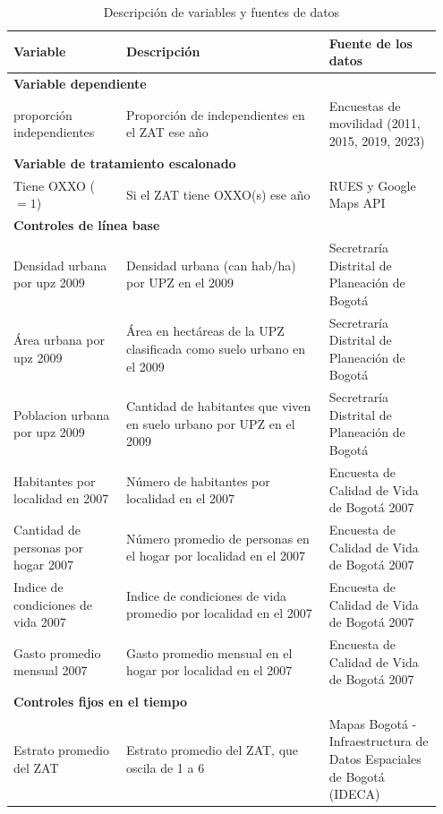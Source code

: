 \documentclass{article}
\begin{document}
\begin{longtable}{p{0.25\linewidth} p{0.45\linewidth} p{0.25\linewidth}}
\caption{Descripción de variables y fuentes de datos}
\label{tab:variables_descripcion}
\\
\toprule
\textbf{Variable} & \textbf{Descripción} & \textbf{Fuente de los datos} \\
\midrule
\endhead
\midrule
\multicolumn{3}{l}{\textbf{Variable dependiente}} \\
\midrule
proporción independientes & Proporción de independientes en el ZAT ese año & Encuestas de movilidad (2011, 2015, 2019, 2023) \\
\midrule
\multicolumn{3}{l}{\textbf{Variable de tratamiento escalonado}} \\
\midrule
Tiene OXXO ($=1$) & Si el ZAT tiene OXXO(s) ese año & RUES y Google Maps API \\
\midrule
\multicolumn{3}{l}{\textbf{Controles de línea base}} \\
\midrule
Densidad urbana por upz 2009 & Densidad urbana (can hab/ha) por UPZ en el 2009 & Secretraría Distrital de Planeación de Bogotá \\
\midrule
Área urbana por upz 2009 & Área en hectáreas de la UPZ clasificada como suelo urbano en el 2009 & Secretraría Distrital de Planeación de Bogotá \\
\midrule
Poblacion urbana por upz 2009 & Cantidad de habitantes que viven en suelo urbano por UPZ en el 2009 & Secretraría Distrital de Planeación de Bogotá \\
\midrule
Habitantes por localidad en 2007 & Número de habitantes por localidad en el 2007 & Encuesta de Calidad de Vida de Bogotá 2007 \\
\midrule
Cantidad de personas por hogar 2007 & Número promedio de personas en el hogar por localidad en el 2007 & Encuesta de Calidad de Vida de Bogotá 2007 \\
\midrule
Indice de condiciones de vida 2007 & Indice de condiciones de vida promedio por localidad en el 2007 & Encuesta de Calidad de Vida de Bogotá 2007 \\
\midrule
Gasto promedio mensual 2007 & Gasto promedio mensual en el hogar por localidad en el 2007 & Encuesta de Calidad de Vida de Bogotá 2007 \\
\midrule
\multicolumn{3}{l}{\textbf{Controles fijos en el tiempo}} \\
\midrule
Estrato promedio del ZAT & Estrato promedio del ZAT, que oscila de 1 a 6 & Mapas Bogotá - Infraestructura de Datos Espaciales de Bogotá (IDECA) \\

\end{longtable}
\end{document}
